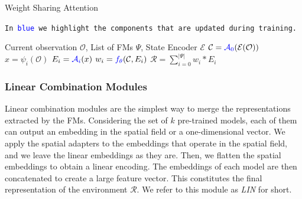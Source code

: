 \begin{algorithm}[ht]
    \caption{Weight Sharing Attention}\label{alg:wsa}
    \texttt{In \textcolor{blue}{blue} we highlight the components that are updated during training.}\\
    \begin{algorithmic}[1]
        \Require Current observation $\mathcal{O}$, List of FMs $\Psi$, State Encoder $\mathcal{E}$
        \State $\mathcal{C} = \textcolor{blue}{\mathcal{A}_0}(\mathcal{E}(\mathcal{O}))$ 
            \State $x = \psi_i(\mathcal{O})$ 
            \State $E_i = \textcolor{blue}{\mathcal{A}_i}(x)$ 
            \State $w_i = \textcolor{blue}{f_\theta}(\mathcal{C}, E_i)$ 
        \EndFor
        \State $\mathcal{R} = \sum_{i=0}^{|\Psi|} w_i * E_i$ 
    \end{algorithmic}
\end{algorithm}





\subsubsection{Linear Combination Modules}\label{subsubsec:linear_combination}
Linear combination modules are the simplest way to merge the representations extracted by the FMs.
Considering the set of $k$ pre-trained models, each of them can output an embedding in the spatial field or a one-dimensional vector.
We apply the spatial adapters to the embeddings that operate in the spatial field, and we leave the linear embeddings as they are.
Then, we flatten the spatial embeddings to obtain a linear encoding.
The embeddings of each model are then concatenated to create a large feature vector.
This constitutes the final representation of the environment $\mathcal{R}$.
We refer to this module as \textit{LIN} for short.

